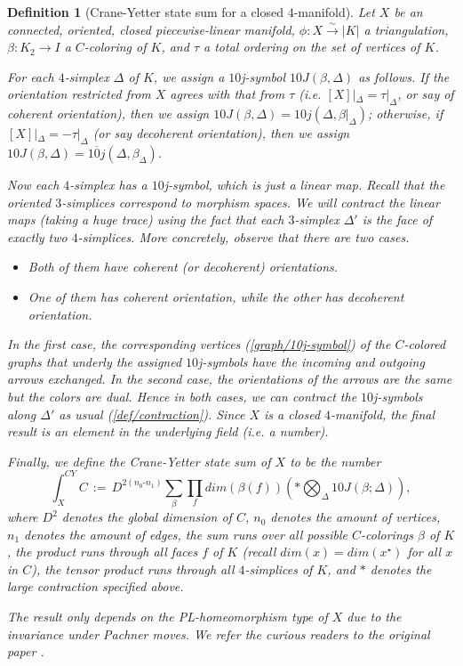 \documentclass[12pt]{extarticle}
\numberwithin{equation}{section} %
\theoremstyle{mystyle}
\newtheorem{definition}[equation]{Definition}
\begin{document}
\begin{definition}[Crane-Yetter state sum for a closed
  $4$-manifold]\label{def/crane-yetter-state-sum-for-a-closed-4-manifold}
  Let $X$ be an connected, oriented, closed piecewise-linear
  manifold, $\phi: X \xrightarrow{\sim} |K|$ a triangulation,
  $\beta: K_{2} \to I$ a $C$-coloring of $K$, and $\tau$ a total
  ordering on the set of vertices of $K$.

  For each $4$-simplex $\Delta$ of $K$, we assign a $10$j-symbol
  $10J(\beta,\Delta)$ as follows. If the orientation restricted
  from $X$ agrees with that from $\tau$ (i.e.
  $[X]|_{\Delta} = \tau|_{\Delta}$, or say of coherent
  orientation), then we assign
  $10J(\beta,\Delta) = 10j(\Delta,\beta|_{\Delta})$; otherwise,
  if $[X]|_{\Delta} = -\tau|_{\Delta}$ (or say decoherent
  orientation), then we assign
  $10J(\beta,\Delta) = \overline{10j}(\Delta,\beta_{\Delta})$.

  Now each $4$-simplex has a $10$j-symbol, which is
  just a linear map. Recall that the oriented $3$-simplices
  correspond to morphism spaces. We will contract the linear maps
  (taking a huge trace) using the fact that each $3$-simplex
  $\Delta'$ is the face of exactly two $4$-simplices. More
  concretely, observe that there are two cases.
  \begin{itemize}
    \item Both of them have coherent (or decoherent) orientations.
    \item One of them has coherent orientation, while the other
          has decoherent orientation.
  \end{itemize}
  In the first case, the corresponding vertices
  (\ref{graph/10j-symbol}) of the $C$-colored graphs that underly
  the assigned $10$j-symbols have the incoming and outgoing
  arrows exchanged. In the second case, the orientations of the
  arrows are the same but the colors are dual. Hence in both
  cases, we can contract the $10$j-symbols along $\Delta'$ as
  usual (\ref{def/contraction}). Since $X$ is a closed
  $4$-manifold, the final result is an element in the underlying
  field (i.e. a number).

  Finally, we define the Crane-Yetter state sum of $X$ to be the
  number
  $$\int_{X}^{CY} C \, := \, D^{2(n_{0}\text{-}n_{1})} \sum_{\beta} \prod_{f} dim(\beta(f)) \left(\ast \bigotimes_{\Delta} 10J(\beta;\Delta)\right),$$
  where $D^{2}$ denotes the global dimension of $C$, $n_{0}$
  denotes the amount of vertices, $n_{1}$ denotes the amount of
  edges, the sum runs over all possible $C$-colorings $\beta$ of
  $K$, the product runs through all faces $f$ of $K$ (recall
  $dim(x)=dim(x^{\star})$ for all $x$ in $C$), the tensor product
  runs through all $4$-simplices of $K$, and $\ast$ denotes the
  large contraction specified above.

  The result only depends on the PL-homeomorphism type of $X$ due
  to the invariance under Pachner moves. We refer the curious
  readers to the original paper
  \cite{crane-yetter/a-categorical-construction-of-4d-tqft}
  \cite{crane-kauffman-yetter/crane-yetter-state-sum}.
\end{definition}
\end{document}
